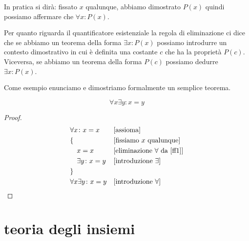 In pratica si dirà: fissato $x$ qualunque, abbiamo dimostrato $P(x)$
quindi possiamo affermare che $\forall x\colon P(x)$.

%
%
Per quanto riguarda il quantificatore esistenziale la regola 
di eliminazione ci dice che se abbiamo un teorema della forma 
$\exists x\colon P(x)$ possiamo introdurre un contesto dimostrativo 
in cui è definita una costante $c$ che ha la proprietà $P(c)$.
%
Viceversa, se abbiamo un teorema della forma $P(c)$ 
possiamo dedurre $\exists x\colon P(x)$.

Come esempio enunciamo e dimostriamo formalmente un semplice 
teorema.

\begin{theorem}
  \[ \forall x \exists y\colon x=y \]
\end{theorem}
\begin{proof}
  \begin{align}
    &\forall x\colon x = x & & \text{[assioma]} \label{ff1}\\
    &\{ & &\text{[fissiamo $x$ qualunque]}\\
    &\quad x=x  & & \text{[eliminazione $\forall$ da \eqref{ff1}]}\\ 
    &\quad \exists y\colon x=y & &\text{[introduzione $\exists$]}\\
    &\} & &\\
    &\forall x\exists y\colon x=y & &\text{[introduzione $\forall$]} 
  \end{align}
\end{proof}

\section{teoria degli insiemi}

